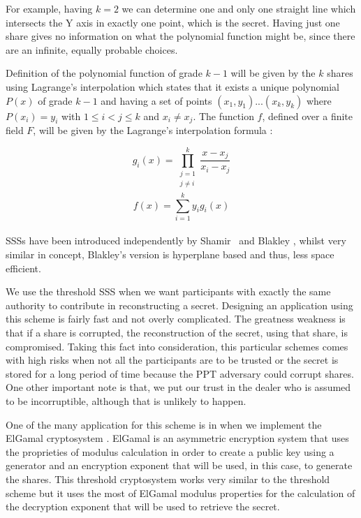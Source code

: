 \documentclass[12pt, a4paper, oneside]{book}
\begin{document}
    For example, having $k{=}2$ we can determine one and only one straight line which intersects the Y axis in exactly one point, which is the secret. Having just one share gives no information on what the polynomial function might be, since there are an infinite, equally probable choices.
    
    Definition of the polynomial function of grade $k{-}1$ will be given by the $k$ shares using Lagrange's interpolation which states that it exists a unique polynomial $ P(x) $ of grade $k{-}1$ and  having a set of points $ (x_1, y_1) ... (x_k, y_k) $ where $ P(x_i){=}y_i$ with $ 1 {\leq} i{<}j {\leq} k $ and $ x_i{\ne}x_j $.
    The function $f$, defined over a finite field $F$, will be given by the Lagrange's interpolation formula \cite{ShareASecret}:
    
    $$g_i(x)= \prod_{\substack{
   j=1 \\
   j{\ne}i \\
  }}^{k} \frac{x-x_j}{x_i-x_j}
  $$
    $$ f(x)= \sum_{i=1}^{k} y_i g_i(x) $$
    \\
    
    SSSs have been introduced independently by Shamir~\cite{ShareASecret} and Blakley \cite{ShareASecret_Blackley}, whilst very similar in concept, Blakley's version is hyperplane based and thus, less space efficient.
    
    We use the threshold SSS when we want participants with exactly the same authority to contribute in reconstructing a secret. Designing an application using this scheme is fairly fast and not overly complicated. The greatness weakness is that if a share is corrupted, the reconstruction of the secret, using that share, is compromised. Taking this fact into consideration, this particular schemes comes with high risks when not all the participants are to be trusted or the secret is stored for a long period of time because the PPT adversary could corrupt shares. One other important note is that, we put our trust in the dealer who is assumed to be incorruptible, although that is unlikely to happen.
    
    One of the many application for this scheme is in when we implement the ElGamal cryptosystem \cite{Threshold_Cr}. ElGamal \cite{ElGamal} is an asymmetric encryption system that uses the proprieties of modulus calculation in order to create a public key using a generator and an encryption exponent that will be used, in this case, to generate the shares. This threshold cryptosystem works very similar to the threshold scheme but it uses the most of ElGamal modulus properties for the calculation of the decryption exponent that will be used to retrieve the secret.
\end{document}
